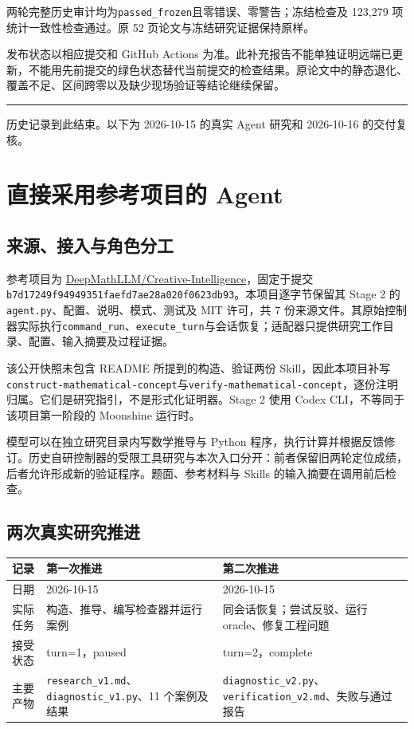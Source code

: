 \documentclass[UTF8,a4paper,zihao=-4,fontset=none]{ctexart}
\newcommand{\code}[1]{{\small\nolinkurl{#1}}}
\begin{document}
两轮完整历史审计均为\code{passed_frozen}且零错误、零警告；冻结检查及 123,279 项统计一致性检查通过。原 52 页论文与冻结研究证据保持原样。

发布状态以相应提交和 GitHub Actions 为准。此补充报告不能单独证明远端已更新，不能用先前提交的绿色状态替代当前提交的检查结果。原论文中的静态退化、覆盖不足、区间跨零以及缺少现场验证等结论继续保留。

\vfill\noindent\textcolor{teal}{\rule{\textwidth}{.6pt}}
{\small\color{muted}历史记录到此结束。以下为 2026-10-15 的真实 Agent 研究和 2026-10-16 的交付复核。}

\newpage
\section{直接采用参考项目的 Agent}
\label{sec:upstream}
\subsection{来源、接入与角色分工}
参考项目为 \href{https://github.com/DeepMathLLM/Creative-Intelligence}{DeepMathLLM/Creative-Intelligence}，固定于提交\code{b7d17249f94949351faefd7ae28a020f0623db93}。本项目逐字节保留其 Stage 2 的\code{agent.py}、配置、说明、模式、测试及 MIT 许可，共 7 份来源文件。其原始控制器实际执行\code{command_run}、\code{execute_turn}与会话恢复；适配器只提供研究工作目录、配置、输入摘要及过程证据。

该公开快照未包含 README 所提到的构造、验证两份 Skill，因此本项目补写\code{construct-mathematical-concept}与\code{verify-mathematical-concept}，逐份注明归属。它们是研究指引，不是形式化证明器。Stage 2 使用 Codex CLI，不等同于该项目第一阶段的 Moonshine 运行时。

模型可以在独立研究目录内写数学推导与 Python 程序，执行计算并根据反馈修订。历史自研控制器的受限工具研究与本次入口分开：前者保留旧两轮定位成绩，后者允许形成新的验证程序。题面、参考材料与 Skills 的输入摘要在调用前后检查。

\subsection{两次真实研究推进}
\noindent\begin{tabularx}{\textwidth}{@{}p{25mm}YY@{}}
\toprule
记录 & 第一次推进 & 第二次推进 \\
\midrule
日期 & 2026-10-15 & 2026-10-15 \\[3pt]
实际任务 & 构造、推导、编写检查器并运行案例 & 同会话恢复；尝试反驳、运行 oracle、修复工程问题 \\[3pt]
接受状态 & turn=1，paused & turn=2，complete \\[3pt]
主要产物 & \code{research_v1.md}、\code{diagnostic_v1.py}、11 个案例及结果 & \code{diagnostic_v2.py}、\code{verification_v2.md}、失败与通过报告 \\
\bottomrule
\end{tabularx}
\end{document}
